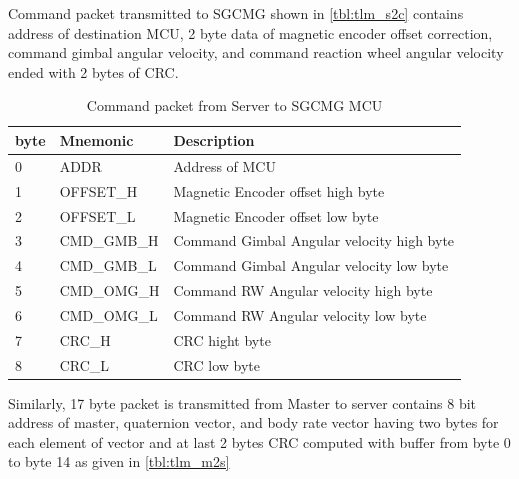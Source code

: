 \noindent Command packet transmitted to SGCMG shown in \autoref{tbl:tlm_s2c} contains address of destination MCU, 2 byte data of magnetic encoder offset correction, command gimbal angular velocity, and command reaction wheel angular velocity ended with 2 bytes of CRC.
\begin{table}[ht]
        \centering
\begin{tabular}{|p{}|p{}|p{}|}
\hline 
 byte & Mnemonic & Description \\
\hline 
 0 & ADDR & Address of MCU \\
\hline 
 1 & OFFSET\_H & Magnetic Encoder offset high byte \\
\hline 
 2 & OFFSET\_L & Magnetic Encoder offset low byte \\
\hline 
 3 & CMD\_GMB\_H & Command Gimbal Angular velocity high byte \\
\hline 
 4 & CMD\_GMB\_L & Command Gimbal Angular velocity low byte \\
\hline 
 5 & CMD\_OMG\_H & Command RW Angular velocity high byte \\
\hline 
 6 & CMD\_OMG\_L & Command RW Angular velocity low byte \\
\hline 
 7 & CRC\_H & CRC hight byte \\
\hline 
 8 & CRC\_L & CRC low byte \\
 \hline
\end{tabular}
        \caption{Command packet from Server to SGCMG MCU}
        \label{tbl:tlm_s2c}
        \end{table}
        
\noindent Similarly, 17 byte packet is transmitted from Master to server contains 8 bit address of master, quaternion vector, and body rate vector having two bytes for each element of vector and at last 2 bytes CRC computed with buffer from byte 0 to byte 14 as given in \autoref{tbl:tlm_m2s}

